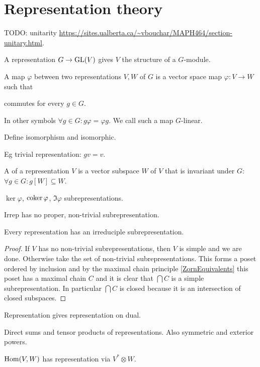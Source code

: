 \section{Representation theory}
TODO: unitarity \url{https://sites.ualberta.ca/~vbouchar/MAPH464/section-unitary.html}.

A representation $G\to \operatorname{GL}(V)$ gives $V$ the structure of a $G$-module.

A map $\varphi$ between two representations $V,W$ of $G$ is a vector space map $\varphi: V\to W$ such that
\begin{center}
commutes for every $g\in G$.
\end{center}
In other symbols $\forall g\in G: g\varphi = \varphi g$.
We call such a map $G$-linear.

Define isomorphism and isomorphic.

Eg trivial representation: $gv = v$.

A  of a representation $V$ is a vector subspace $W$ of $V$ that is invariant under $G$: $\forall g\in G: g[W]\subseteq W$.

$\ker \varphi$, $\operatorname{coker} \varphi$, $\Im \varphi$ subrepresentations.

Irrep has no proper, non-trivial subrepresentation.

\begin{lemma} \label{existenceIrreps}
Every representation has an irreduciple subrepresentation.
\end{lemma}
\begin{proof}
If $V$ has no non-trivial subrepresentations, then $V$ is simple and we are done. 
Otherwise take the set of non-trivial subrepresentations. This forms a poset ordered by inclusion and by the maximal chain principle \ref{ZornEquivalents} this poset has a maximal chain $C$ and it is clear that $\bigcap C$ is a simple subrepresentation. In particular $\bigcap C$ is closed because it is an intersection of closed subspaces.
\end{proof}

Representation gives representation on dual.

Direct sums and tensor products of representations. Also symmetric and exterior powers.

$\operatorname{Hom}(V,W)$ has representation via $V^*\otimes W$.

